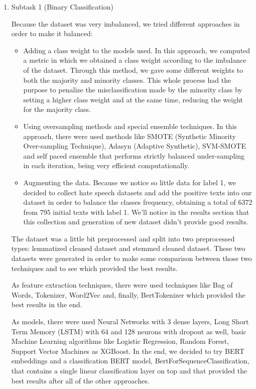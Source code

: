 \documentclass[11pt]{article}
\begin{document}
\begin{enumerate}
\item Subtask 1 (Binary Classification)

Because the dataset was very imbalanced, we tried different approaches in
order to make it balanced:

\begin{itemize}
\item Adding a class weight to the models used. In this approach, we
computed a metric in which we obtained a class weight according to the
imbalance of the dataset. Through this method, we gave some different
weights to both the majority and minority classes. This whole process had
the purpose to penalize the misclassification made by the minority class by
setting a higher class weight and at the same time, reducing the weight for
the majority class.

\item Using oversampling methods and special ensemble techniques. In this
approach, there were used methods like SMOTE (Synthetic Minority
Over-sampling Technique), Adasyn (Adaptive Synthetic), SVM-SMOTE and self
paced ensemble that performs strictly balanced under-sampling in each
iteration, being very efficient computationally.

\item Augmenting the data. Because we notice so little data for label 1, we
decided to collect hate speech datasets and add the positive texts into our
dataset in order to balance the classes frequency, obtaining a total of 6372
from 795 initial texts with label 1. We'll notice in the results section
that this collection and generation of new dataset didn't provide good
results.
\end{itemize}

The dataset was a little bit preprocessed and split into two preprocessed
types: lemmatized cleaned dataset and stemmed cleaned dataset. These two
datasets were generated in order to make some comparison between those two
techniques and to see which provided the best results.

As feature extraction techniques, there were used techniques like Bag of
Words, Tokenizer, Word2Vec and, finally, BertTokenizer which provided the
best results in the end.

As models, there were used Neural Networks with 3 dense layers, Long Short
Term Memory (LSTM) with 64 and 128 neurons with dropout as well, basic
Machine Learning algorithms like Logistic Regression, Random Forest, Support
Vector Machines as XGBoost. In the end, we decided to try BERT embeddings
and a classification BERT model, BertForSequenceClassification, that
contains a single linear classification layer on top and that provided the
best results after all of the other approaches.


\end{enumerate}
\end{document}
